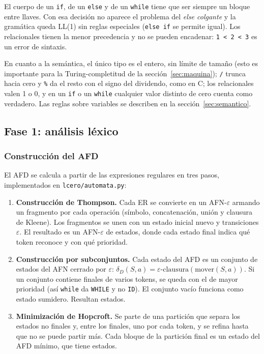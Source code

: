 \documentclass[11pt,a4paper]{article}
\theoremstyle{definition}
\newcommand{\tm}[1]{\texttt{#1}}
\newcommand{\eps}{\varepsilon}
\renewcommand{\paragraph}[1]{\subsubsection*{#1}}
\begin{document}
El cuerpo de un \tm{if}, de un \tm{else} y de un \tm{while} tiene que ser
siempre un bloque entre llaves. Con esa decisión no aparece el problema del
\emph{else colgante} y la gramática queda LL(1) sin reglas especiales
(\tm{else if} se permite igual). Los relacionales tienen la menor
precedencia y no se pueden encadenar: \tm{1 < 2 < 3} es un error de
sintaxis.

En cuanto a la semántica, el único tipo es el entero, sin límite de tamaño
(esto es importante para la Turing-completitud de la sección~\ref{sec:maquina});
\tm{/} trunca hacia cero y \tm{\%} da el resto con el signo del dividendo,
como en C; los relacionales valen 1 o 0, y en un \tm{if} o un \tm{while}
cualquier valor distinto de cero cuenta como verdadero. Las reglas sobre
variables se describen en la sección~\ref{sec:semantico}.

\subsection{Fase 1: análisis léxico}

\paragraph{Construcción del AFD}

El AFD se calcula a partir de las expresiones regulares en tres pasos,
implementados en \tm{lcero/automata.py}:

\begin{enumerate}
  \item \textbf{Construcción de Thompson.} Cada ER se convierte en un AFN-$\eps$
  armando un fragmento por cada operación (símbolo, concatenación, unión y
  clausura de Kleene). Los \NTokens{} fragmentos se unen con un estado
  inicial nuevo y transiciones $\eps$. El resultado es un AFN-$\eps$ de
  \NAFN{} estados, donde cada estado final indica qué token reconoce y con
  qué prioridad.
  \item \textbf{Construcción por subconjuntos.} Cada estado del AFD es un
  conjunto de estados del AFN cerrado por $\eps$:
  $\delta_D(S, a) = \eps\text{-clausura}(\mathrm{mover}(S, a))$. Si un
  conjunto contiene finales de varios tokens, se queda con el de mayor
  prioridad (así \tm{while} da \tm{WHILE} y no \tm{ID}). El conjunto vacío
  funciona como estado sumidero. Resultan \NAFD{} estados.
  \item \textbf{Minimización de Hopcroft.} Se parte de una partición que
  separa los estados no finales y, entre los finales, uno por cada token, y
  se refina hasta que no se puede partir más. Cada bloque de la partición
  final es un estado del AFD mínimo, que tiene \NMin{} estados.
\end{enumerate}
\end{document}
